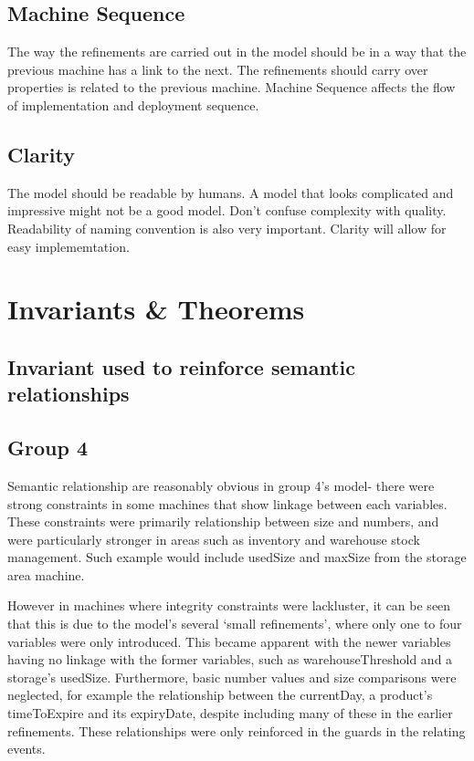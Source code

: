 \subsection{Machine Sequence}
\label{machinesequence}

The way the refinements are carried out in the model should be in a way that the previous machine has a link to the next. The refinements should carry over properties is related to the previous machine. Machine Sequence affects the flow of implementation and deployment sequence.

\subsection{Clarity}
\label{clarity}

The model should be readable by humans. A model that looks complicated and impressive might not be a good model. Don't confuse complexity with quality. Readability of naming convention is also very important. Clarity will allow for easy implememtation.

\section{Invariants \& Theorems}
\label{invariantstheorems}

\subsection{Invariant used to reinforce semantic relationships}
\label{invariantusedtoreinforcesemanticrelationships}

\subsection{Group 4}
\label{group4}

Semantic relationship are reasonably obvious in group 4's model- there were strong constraints in some machines that show linkage between each variables. These constraints were primarily relationship between size and numbers, and were particularly stronger in areas such as inventory and warehouse stock management. Such example would include usedSize and maxSize from the storage area machine.

However in machines where integrity constraints were lackluster, it can be seen that this is due to the model’s several ‘small refinements’, where only one to four variables were only introduced. This became apparent with the newer variables having no linkage with the former variables, such as warehouseThreshold and a storage’s usedSize. Furthermore, basic number values and size comparisons were neglected, for example the relationship between the currentDay, a product’s timeToExpire and its expiryDate, despite including many of these in the earlier refinements. These relationships were only reinforced in the guards in the relating events.

